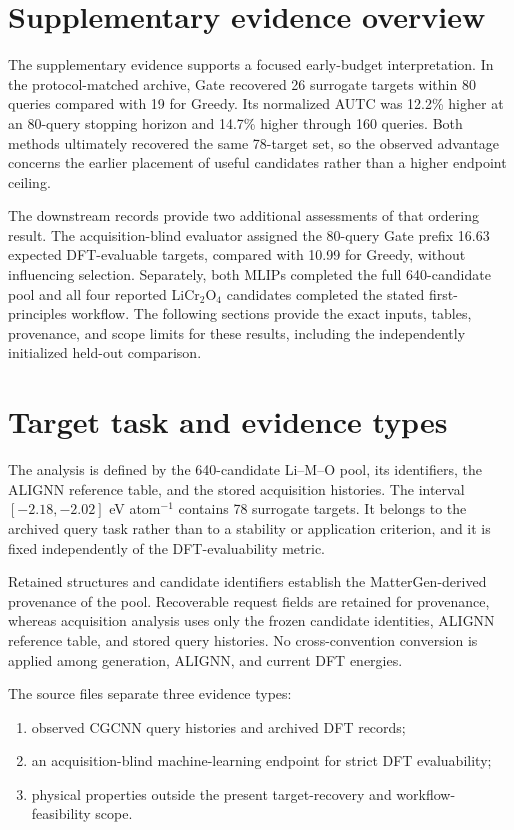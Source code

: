 \documentclass[cmc,article,submit,moreauthors,pdftex]{Definitions/tsp}
\begin{document}
\section{Supplementary evidence overview}

The supplementary evidence supports a focused early-budget interpretation. In
the protocol-matched archive, Gate recovered 26 surrogate targets within 80
queries compared with 19 for Greedy. Its normalized AUTC was 12.2\% higher at an
80-query stopping horizon and 14.7\% higher through 160 queries. Both methods
ultimately recovered the same 78-target set, so the observed advantage concerns
the earlier placement of useful candidates rather than a higher endpoint
ceiling.

The downstream records provide two additional assessments of that ordering result. The
acquisition-blind evaluator assigned the 80-query Gate prefix 16.63 expected
DFT-evaluable targets, compared with 10.99 for Greedy, without influencing
selection. Separately, both MLIPs completed the full 640-candidate pool and all
four reported LiCr$_2$O$_4$ candidates completed the stated first-principles
workflow. The following sections provide the exact inputs, tables, provenance,
and scope limits for these results, including the independently initialized
held-out comparison.

\section{Target task and evidence types}

The analysis is defined by the 640-candidate Li--M--O pool, its identifiers, the
ALIGNN reference table, and the stored acquisition histories. The interval
$[-2.18,-2.02]$ eV atom$^{-1}$ contains 78 surrogate targets. It belongs to the
archived query task rather than to a stability or application criterion, and it
is fixed independently of the DFT-evaluability metric.

Retained structures and candidate identifiers establish the MatterGen-derived
provenance of the pool. Recoverable request fields are retained for provenance,
whereas acquisition analysis uses only the frozen candidate identities, ALIGNN
reference table, and stored query histories. No cross-convention conversion is
applied among generation, ALIGNN, and current DFT energies.

The source files separate three evidence types:
\begin{enumerate}
\item observed CGCNN query histories and archived DFT records;
\item an acquisition-blind machine-learning endpoint for strict DFT evaluability;
\item physical properties outside the present target-recovery and
workflow-feasibility scope.
\end{enumerate}
\end{document}
